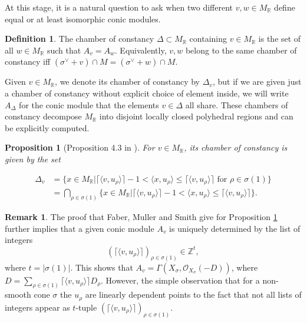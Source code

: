 \documentclass[reqno, 12pt]{amsart}
\newtheorem{proposition}[theorem]{Proposition}
\theoremstyle{definition}
\newtheorem{definition}[theorem]{Definition}
\newtheorem{remark}[theorem]{Remark}
\numberwithin{equation}{section}
\newcommand{\newterm}{\textsf}
\newcommand{\Z}{\mathbb{Z}}
\newcommand{\R}{\mathbb{R}}
\def\O{\mathcal{O}}
\begin{document}
At this stage, it is a natural question to ask when two different $v,w\in M_\R$ define equal or at least isomorphic conic modules.
\begin{definition}
    \label{Def:ChamOfCons}
    The \newterm{chamber of constancy} $\Delta\subset M_\R$ containing $v\in M_\R$ is the set of all $w\in M_\R$ such that $A_v=A_w$. Equivalently, $v,w$ belong to the same chamber of constancy iff $(\sigma^\vee+v)\cap M=(\sigma^\vee+w)\cap M$.
\end{definition} 
Given $v\in M_\R$, we denote its chamber of constancy by $\Delta_v$, but if we are given just a chamber of constancy without explicit choice of element inside, we will write $A_\Delta$ for the conic module that the elements $v\in \Delta$ all share. These chambers of constancy decompose $M_\R$ into disjoint locally closed polyhedral regions \cite[Corollary 4.4]{FMS19} and can be explicitly computed.
\begin{proposition}[Proposition 4.3 in \cite{FMS19}]
    \label{Prop:ComputeChamofCon}
    For $v\in M_\R$, its chamber of constancy is given by the set
    
    \begin{align*}
      \Delta_v&=\{x \in M_\R\vert \lceil \langle v, u_\rho\rangle\rceil-1<\langle x,u_\rho\rangle\le \lceil\langle v, u_\rho\rangle\rceil\text{ for }\rho\in\sigma(1)\}\\
      &=\bigcap_{\rho\in\sigma(1)}\{x\in M_\R\vert \lceil \langle v, u_\rho\rangle\rceil-1<\langle x,u_\rho\rangle\le \lceil\langle v,u_\rho\rangle\rceil\}.
    \end{align*}
\end{proposition}

\begin{remark}
\label{Rem:ConModBundle}
    The proof that Faber, Muller and Smith give for Proposition \ref{Prop:ComputeChamofCon} further implies that a given conic module $A_v$ is uniquely determined by the list of integers\[
    (\lceil \langle v,u_\rho\rangle \rceil)_{\rho\in\sigma(1)}\in \Z^t,
    \]
    where $t=|\sigma(1)|$. This shows that $A_v=\Gamma(X_\sigma,\O_{X_\sigma}(-D))$, where $D=\sum_{\rho\in\sigma(1)} \lceil\langle v,u_\rho\rangle\rceil D_\rho$. However, the simple observation that for a non-smooth cone $\sigma$ the $u_\rho$ are linearly dependent points to the fact that not all lists of integers appear as $t$-tuple $(\lceil \langle v,u_\rho\rangle \rceil)_{\rho\in\sigma(1)}$.
\end{remark}
\end{document}
